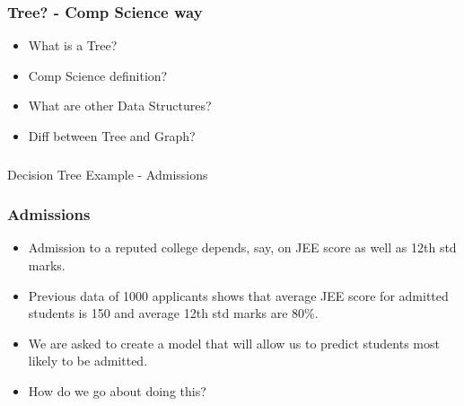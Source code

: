 
\begin{frame}[fragile]\frametitle{Tree? - Comp Science way}
\begin{itemize}
	\item What is a Tree?
	\item Comp Science definition?
	\item What are other Data Structures?
	\item Diff between Tree and Graph?
	\end{itemize}
\end{frame}

\begin{frame}[fragile]\frametitle{}
\begin{center}
{\Large Decision Tree Example - Admissions}
\end{center}
\end{frame}

\begin{frame}[fragile]\frametitle{Admissions}
\begin{itemize}
	\item Admission to a reputed college depends, say, on JEE score as well as 12th std marks.
	\item Previous data of 1000 applicants shows that average JEE score for admitted students is 150 and average 12th std marks are 80\%. 
	\item We are asked to create a model that will allow us to predict students most likely to be admitted. 
	\item How do we go about doing this?
	\end{itemize}
\end{frame}

